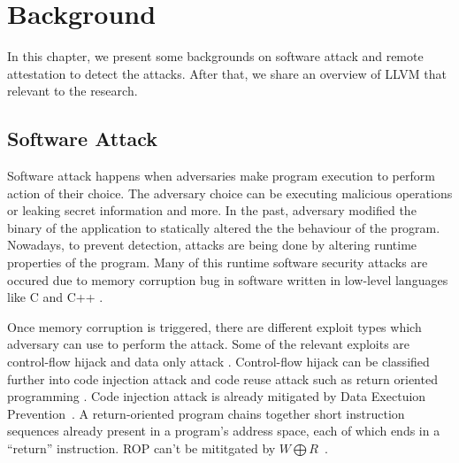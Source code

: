 
\chapter{Background} %

\label{Chapter2} %

In this chapter, we present some backgrounds on software attack and remote attestation to detect the attacks. After that, we share an overview of LLVM that relevant to the research. 

\section{Software Attack}


Software attack happens when adversaries make program execution to perform action of their choice. The adversary choice can be executing malicious operations or leaking secret information and more.  In the past, adversary modified the binary of the application to statically altered the the behaviour of the program. Nowadays, to prevent detection, attacks are being done by altering runtime properties of the program. Many of this runtime software security attacks are occured due to memory corruption bug in software written in low-level languages like C and C++ \cite{szekeresSoKEternalWar2013}.

Once memory corruption is triggered, there are different exploit types which 
adversary can use to perform the attack. Some of the relevant exploits are 
control-flow hijack \cite{shachamGeometryInnocentFlesh2007, 
schusterCounterfeitObjectorientedProgramming2015}  and data only attack 
\cite{chenNonControlDataAttacksAre2005, 
carliniControlFlowBendingEffectiveness2015}. Control-flow hijack can be 
classified further into code injection attack and code reuse attack such as 
return oriented programming \cite{roemerReturnorientedProgrammingSystems2012}. 
Code injection attack is already mitigated by Data Exectuion 
Prevention~. A return-oriented program chains together short 
instruction sequences already 
present in a program’s address space, each of which ends in a “return”
 instruction. ROP can't be mititgated by \( W \bigoplus R \)~.
 
